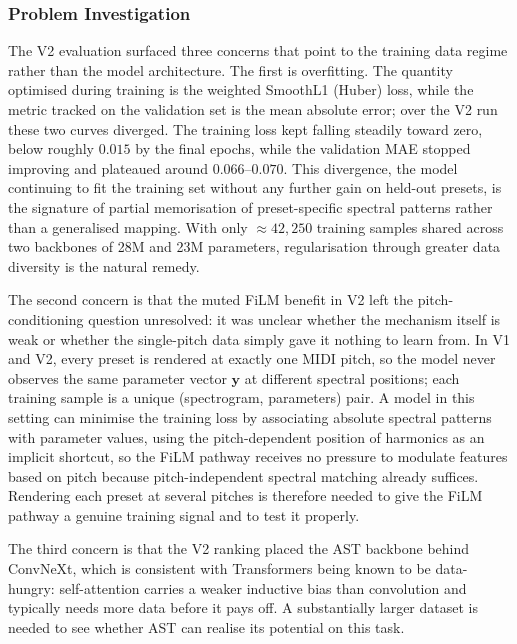 \subsubsection{Problem Investigation}

\noindent
The V2 evaluation surfaced three concerns that point to the training data regime rather than the model architecture. The first is overfitting. The quantity optimised during training is the weighted SmoothL1 (Huber) loss, while the metric tracked on the validation set is the mean absolute error; over the V2 run these two curves diverged. The training loss kept falling steadily toward zero, below roughly $0.015$ by the final epochs, while the validation MAE stopped improving and plateaued around $0.066$–$0.070$. This divergence, the model continuing to fit the training set without any further gain on held-out presets, is the signature of partial memorisation of preset-specific spectral patterns rather than a generalised mapping. With only $\approx 42{,}250$ training samples shared across two backbones of 28M and 23M parameters, regularisation through greater data diversity is the natural remedy.

\noindent \newline
The second concern is that the muted FiLM benefit in V2 left the pitch-conditioning question unresolved: it was unclear whether the mechanism itself is weak or whether the single-pitch data simply gave it nothing to learn from. In V1 and V2, every preset is rendered at exactly one MIDI pitch, so the model never observes the same parameter vector $\mathbf{y}$ at different spectral positions; each training sample is a unique (spectrogram, parameters) pair. A model in this setting can minimise the training loss by associating absolute spectral patterns with parameter values, using the pitch-dependent position of harmonics as an implicit shortcut, so the FiLM pathway receives no pressure to modulate features based on pitch because pitch-independent spectral matching already suffices. Rendering each preset at several pitches is therefore needed to give the FiLM pathway a genuine training signal and to test it properly.

\noindent \newline
The third concern is that the V2 ranking placed the AST backbone behind ConvNeXt, which is consistent with Transformers being known to be data-hungry: self-attention carries a weaker inductive bias than convolution and typically needs more data before it pays off. A substantially larger dataset is needed to see whether AST can realise its potential on this task.

